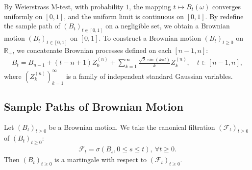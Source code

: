 \documentclass{article}
\numberwithin{equation}{section}
\theoremstyle{plain}
\theoremstyle{definition}
\begin{document}
By Weierstrass M-test, with probability $1$, the mapping $t\mapsto B_t(\omega)$ converges uniformly on $[0,1]$, and the uniform limit is continuous on $[0,1]$. By redefine the sample path of $(B_t)_{t\in[0,1]}$ on a negligible set, we obtain a Brownian motion $(B_t)_{t\in[0,1]}$ on $[0,1]$. To construct a Brownian motion $(B_t)_{t\geq 0}$ on $\mathbb{R}_+$, we concatenate Brownian processes defined on each $[n-1,n]$:
\begin{align*}
	B_t=B_{n-1}+(t-n+1)Z_0^{(n)} + \sum_{k=1}^\infty\frac{\sqrt{2}\sin(k\pi t)}{k}Z_k^{(n)},\quad t\in[n-1,n],
\end{align*}
where $(Z_k^{(n)})_{k=1}^\infty$ is a family of independent standard Gaussian variables.

\newpage
\subsection{Sample Paths of Brownian Motion}
Let $(B_t)_{t\geq 0}$ be a Brownian motion. We take the canonical filtration $(\mathscr{F}_t)_{t\geq 0}$ of $(B_t)_{t\geq 0}$:
\begin{align*}
	\mathscr{F}_t = \sigma\left(B_s,0\leq s\leq t\right),\ \forall t\geq 0.
\end{align*}
Then $(B_t)_{t\geq 0}$ is a martingale with respect to $(\mathscr{F}_t)_{t\geq 0}$.
\end{document}
